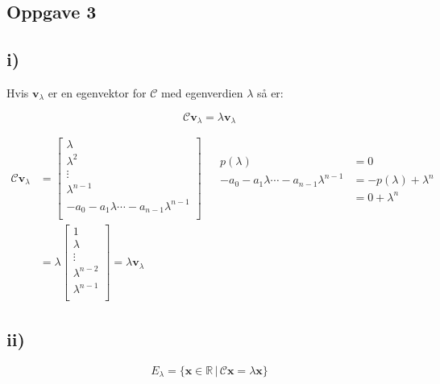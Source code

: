 \documentclass[a4paper, norsk, twoside, 10pt]{article}
\begin{document}
\begin{flushleft}
  \section*{Oppgave 3}

  \subsection*{i)}

  Hvis $\mathbf{v}_{\lambda}$ er en egenvektor for $\mathcal{C}$ med egenverdien $\lambda$ så er:

  \[\mathcal{C}\mathbf{v}_{\lambda} = \lambda \mathbf{v}_{\lambda}\]

  \begin{align*}
    \mathcal{C}\mathbf{v}_{\lambda} &=
    \begin{bmatrix}
      \lambda \\
      \lambda^{2} \\
      \vdots \\
      \lambda^{n-1} \\
      -a_{0} - a_{1}\lambda \cdots -a_{n-1}\lambda^{n-1}\\
    \end{bmatrix}
    &\begin{matrix}
       \begin{split}
         p(\lambda) &= 0\\
         -a_{0} - a_{1}\lambda \cdots -a_{n-1}\lambda^{n-1} &= -p(\lambda) + \lambda^{n} \\
         &= 0 +\lambda^{n}
       \end{split}
     \end{matrix} \\
    &= \lambda
    \begin{bmatrix}
      1 \\
      \lambda \\
      \vdots \\
      \lambda^{n-2} \\
      \lambda^{n-1} \\
    \end{bmatrix}
    = \lambda \mathbf{v}_{\lambda}
  \end{align*}

  \subsection*{ii)}

  \[E_{\lambda} = \{\mathbf{x} \in \mathbb{R} \, | \, \mathcal{C} \mathbf{x} = \lambda \mathbf{x}\}\]


\end{flushleft}
\end{document}
